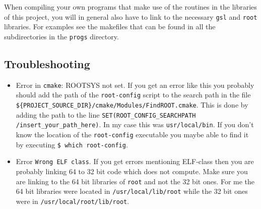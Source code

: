 When compiling your own programs that make use of the routines in the libraries 
of this project, you will in general also have to link to the necessary 
\texttt{gsl} and \texttt{root} libraries.  For examples see the makefiles that 
can be found in all the subdirectories in the \texttt{progs} directory.  


\subsection{Troubleshooting}
\begin{itemize}
\item Error in \texttt{cmake}: ROOTSYS not set.
If you get an error like this you probably should add the path of the 
\texttt{root-config} script to the search path in the file 
\texttt{\$\{PROJECT\_SOURCE\_DIR\}/cmake/Modules/FindROOT.cmake}. This is done 
by adding the path to the line \texttt{SET(ROOT\_CONFIG\_SEARCHPATH 
/insert\_your\_path\_here)}. In my case this was \texttt{usr/local/bin}. If you 
don't know the location of the \texttt{root-config} executable you maybe able to 
find it by executing \texttt{\$ which root-config}.
\item Error \texttt{Wrong ELF class}. If you get errors mentioning ELF-class then you are probably linking 64 to 32 bit code which does not compute. Make sure you are linking to the 64 bit libraries of \texttt{root} and not the 32 bit ones. For me the 64 bit libraries were located in \texttt{/usr/local/lib/root} while the 32 bit ones were in \texttt{/usr/local/root/lib/root}. 
\end{itemize}

